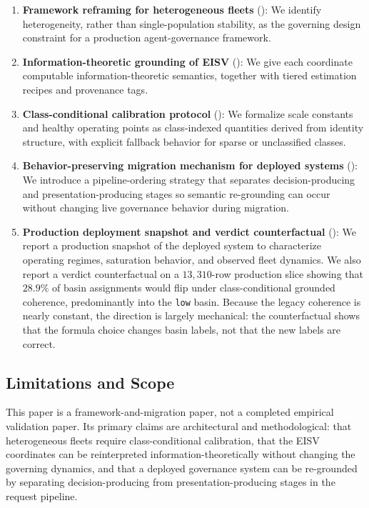 \documentclass[11pt,twocolumn]{article}
\begin{document}
\begin{enumerate}
\item \textbf{Framework reframing for heterogeneous fleets}
  (): We identify heterogeneity, rather than
  single-population stability, as the governing design constraint for a
  production agent-governance framework.

\item \textbf{Information-theoretic grounding of EISV}
  (): We give each coordinate computable
  information-theoretic semantics, together with tiered estimation
  recipes and provenance tags.

\item \textbf{Class-conditional calibration protocol}
  (): We formalize scale constants and
  healthy operating points as class-indexed quantities derived from
  identity structure, with explicit fallback behavior for sparse or
  unclassified classes.

\item \textbf{Behavior-preserving migration mechanism for deployed systems}
  (): We introduce a pipeline-ordering strategy
  that separates decision-producing and presentation-producing stages so
  semantic re-grounding can occur without changing live governance
  behavior during migration.

\item \textbf{Production deployment snapshot and verdict counterfactual}
  (): We report a production snapshot of the
  deployed system to characterize operating regimes, saturation
  behavior, and observed fleet dynamics. We also report a verdict
  counterfactual on a $13{,}310$-row production slice showing that
  $28.9\%$ of basin assignments would flip under class-conditional
  grounded coherence, predominantly into the \texttt{low} basin.
  Because the legacy coherence is nearly constant, the direction is
  largely mechanical: the counterfactual shows that the formula
  choice changes basin labels, not that the new labels are
  correct.
\end{enumerate}

\subsection{Limitations and Scope}
\label{sec:limitations-and-scope}

This paper is a framework-and-migration paper, not a completed
empirical validation paper. Its primary claims are architectural and
methodological: that heterogeneous fleets require class-conditional
calibration, that the EISV coordinates can be reinterpreted
information-theoretically without changing the governing dynamics, and
that a deployed governance system can be re-grounded by separating
decision-producing from presentation-producing stages in the request
pipeline.
\end{document}
